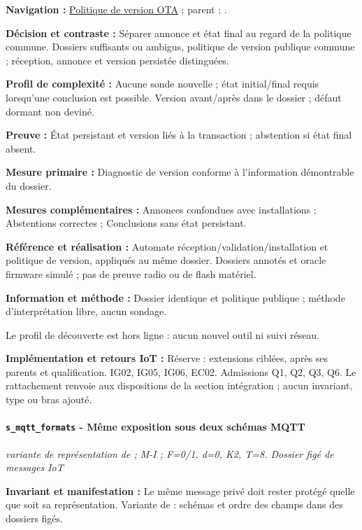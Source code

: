\documentclass[11pt,a4paper]{article}
\newcommand{\code}[1]{{\small\ttfamily\path{#1}}}
\newcommand{\scenariolink}[1]{\hyperref[scenario:#1]{\code{#1}}}
\newcommand{\comparisonlink}[2]{\hyperlink{comparison:#1}{#2}}
\begin{document}
\textbf{Navigation :} \comparisonlink{E06}{Politique de version OTA} ; parent : \scenariolink{s_ota_version}.

\textbf{Décision et contraste :} Séparer annonce et état final au regard de la politique commune. Dossiers suffisants ou ambigus, politique de version publique commune ; réception, annonce et version persistée distinguées.

\textbf{Profil de complexité :} Aucune sonde nouvelle ; état initial/final requis lorsqu’une conclusion est possible. Version avant/après dans le dossier ; défaut dormant non deviné.

\textbf{Preuve :} État persistant et version liés à la transaction ; abstention si état final absent.

\textbf{Mesure primaire :} Diagnostic de version conforme à l’information démontrable du dossier.

\textbf{Mesures complémentaires :} Annonces confondues avec installations ; Abstentions correctes ; Conclusions sans état persistant.

\textbf{Référence et réalisation :} Automate réception/validation/installation et politique de version, appliqués au même dossier. Dossiers annotés et oracle firmware simulé ; pas de preuve radio ou de flash matériel.

\textbf{Information et méthode :} Dossier identique et politique publique ; méthode d’interprétation libre, aucun sondage.

Le profil de découverte est hors ligne : aucun nouvel outil ni suivi réseau.

\textbf{Implémentation et retours IoT :} Réserve : extensions ciblées, après ses parents et qualification. IG02, IG05, IG06, EC02. Admissions Q1, Q2, Q3, Q6. Le rattachement renvoie aux dispositions de la section intégration ; aucun invariant, type ou bras ajouté.

\par\noindent\begin{minipage}{\linewidth}\setlength{\parskip}{5pt}\paragraph{\texttt{s\_mqtt\_formats} - Même exposition sous deux schémas MQTT}\label{scenario:s_mqtt_formats}
\textit{variante de représentation de \scenariolink{s_mqtt_lecture} ; M-I ; F=0/1, d=0, K2, T=8. Dossier figé de messages IoT}

\textbf{Invariant et manifestation :} Le même message privé doit rester protégé quelle que soit sa représentation. Variante de \scenariolink{s_mqtt_lecture} : schémas et ordre des champs dans des dossiers figés.\par\end{minipage}\par
\end{document}
